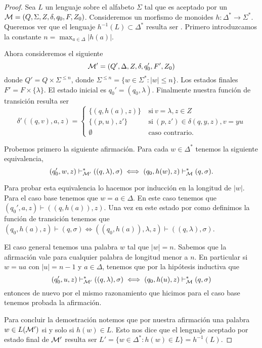 \documentclass[tesis.tex]{subfiles}
\begin{document}
\begin{proof}
	Sea $L$ un lenguaje \ic sobre el alfabeto $\Sigma$ tal que es aceptado por un \APND ${\cal M } = (Q, \Sigma, Z, \delta, q_0, F, Z_0)$.
	Consideremos un morfismo de monoides $h: \Delta^* \to \Sigma^*$. 
	Queremos ver que el lenguaje $h^{-1}(L) \subset \Delta^*$ resulta ser \ic. 
	Primero introduzcamos la constante $ n = \max_{a \in \Delta} |h(a)|$.
	
	Ahora consideremos el siguiente \APND 
	\[
	{\cal M' } = (Q', \Delta, Z, \delta, q_0', F', Z_0)
	\]
	donde $Q' = Q \times \Sigma^{\le n}$, donde $\Sigma^{\le n} = \{ w \in \Sigma^* : |w| \le n  \}$.
	Los estados finales $F' = F \times \{ \lambda \}$.
	El estado inicial es $q_0' = (q_0, \lambda)$.
	Finalmente nuestra función de transición resulta ser 
	\[
	\delta'((q,v), a ,z) = 
	\begin{cases}
		\{(q,h(a), z )\}  \ &\text{si} \ v=\lambda, z \in Z \\
		\{(p,u),z' \} \ &\text{si} \ (p,z') \in \delta(q,y,z), v=yu \\  
		\emptyset \ &\text{caso contrario}.
	\end{cases}
	\]
	
	Probemos primero la siguiente afirmación.
	Para cada $w \in \Delta^*$ tenemos la siguiente equivalencia,
	\[
	(q_0',w,z) \vdash^*_{\cal M'} ((q,\lambda), \sigma) \iff (q_0,h(w), z) \vdash^*_{\cal M} (q, \sigma).
	\]
	
	Para probar esta equivalencia lo hacemos por inducción en la longitud de $|w|$.
	Para el caso base tenemos que $w = a \in \Delta$.
	En este caso tenemos que $(q_0', a, z) \vdash ((q,h(a)), z)$.
	Una vez en este estado por como definimos la función de transición tenemos que $ (q_0,h(a), z) \vdash (q, \sigma)  \iff ((q_0,h(a)), \lambda ,z) \vdash ((q,\lambda), \sigma)$.
	
	El caso general tenemos una palabra $w$ tal que $|w|=n$.
	Sabemos que la afirmación vale para cualquier palabra de longitud menor a $n$.
	En particular si $w=ua$ con $|u|=n-1$ y $a \in \Delta$, tenemos que por la hipótesis inductiva que 
	\[
	(q_0',u,z) \vdash^*_{\cal M'} ((q,\lambda), \sigma) \iff (q_0,h(u), z) \vdash^*_{\cal M} (q, \sigma)
	\]
	entonces de nuevo por el mismo razonamiento que hicimos para el caso base tenemos probada la afirmación.
	
	Para concluir la demostración notemos que por nuestra afirmación una palabra $w \in L(\cal M')$ si y solo si $h(w) \in L$. 
	Esto nos dice que el lenguaje aceptado por estado final de $\cal M'$ resulta ser $L' = \{ w \in \Delta^* : h(w) \in L \} = h^{-1}(L)$.
\end{proof}
\end{document}
